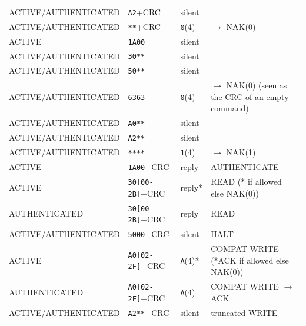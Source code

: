 \begin{longtable}{l l l l}
ACTIVE/AUTHENTICATED & \texttt{A2}+CRC                     & silent          &                                             \\
ACTIVE/AUTHENTICATED & \texttt{**}+CRC                     & \texttt{0}(4)            & $\rightarrow$ NAK(0)                        \\
ACTIVE               & \texttt{1A00}                       & silent          &                                             \\
ACTIVE/AUTHENTICATED & \texttt{30**}                       & silent          &                                             \\
ACTIVE/AUTHENTICATED & \texttt{50**}                       & silent          &                                             \\
ACTIVE/AUTHENTICATED & \texttt{6363}                       & \texttt{0}(4)            & $\rightarrow$ NAK(0) (seen as the CRC of an empty command)                       \\
ACTIVE/AUTHENTICATED & \texttt{A0**}                       & silent          &                                             \\
ACTIVE/AUTHENTICATED & \texttt{A2**}                       & silent          &                                             \\
ACTIVE/AUTHENTICATED & \texttt{****}                       & \texttt{1}(4)            & $\rightarrow$ NAK(1)                        \\
ACTIVE               & \texttt{1A00}+CRC                   & reply           & AUTHENTICATE                                \\
ACTIVE               & \texttt{30[00-2B]}+CRC              & reply*          & READ (* if allowed else NAK(0))             \\
AUTHENTICATED        & \texttt{30[00-2B]}+CRC              & reply           & READ                                        \\
ACTIVE/AUTHENTICATED & \texttt{5000}+CRC                   & silent          & HALT                                        \\
ACTIVE               & \texttt{A0[02-2F]}+CRC          & \texttt{A}(4)*           & COMPAT WRITE (*ACK if allowed else NAK(0))  \\
AUTHENTICATED        & \texttt{A0[02-2F]}+CRC          & \texttt{A}(4)            & COMPAT WRITE $\rightarrow$ ACK              \\
ACTIVE/AUTHENTICATED & \texttt{A2**}+CRC                   & silent          & truncated WRITE                             \\

\end{longtable}
